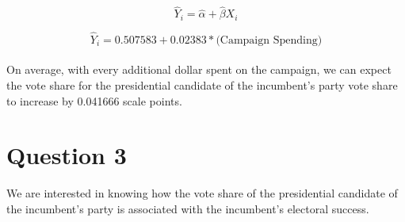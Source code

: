 \documentclass[12pt,letterpaper]{article}
\begin{document}
		{\large 			$$\hat{Y}_i = \hat{\alpha} +  \hat{\beta}X_i $$}
		
		
		{ 			$$\hat{Y}_i =  0.507583 +  0.02383 * \text{(Campaign Spending)} $$} \\
		
	
	\noindent On average, with every additional dollar spent on the campaign, we can expect the vote share for the presidential candidate of the incumbent's party vote share to increase by 0.041666 scale points.
		

	
	\newpage	
\section*{Question 3}

\noindent We are interested in knowing how the vote share of the presidential candidate of the incumbent's party is associated with the incumbent's electoral success.
	\vspace{.25cm}
\end{document}
